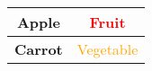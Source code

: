 \begingroup
    
    \def\cellA{\textbf{Apple}}
    \def\cellB{\textcolor{red}{Fruit}}
    \def\cellC{\textbf{Carrot}}
    \def\cellD{\textcolor{orange}{Vegetable}}

    \begin{center}
        \begin{tabular}{|c|c|}
        \hline
        \cellA & \cellB \\ \hline
        \cellC & \cellD \\ \hline
        \end{tabular}
    \end{center}
    \medskip
\endgroup